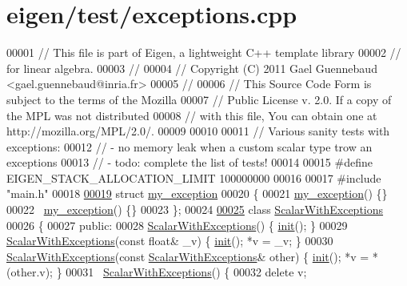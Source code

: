 \hypertarget{eigen_2test_2exceptions_8cpp_source}{}\section{eigen/test/exceptions.cpp}
\label{eigen_2test_2exceptions_8cpp_source}

\begin{DoxyCode}
00001 \textcolor{comment}{// This file is part of Eigen, a lightweight C++ template library}
00002 \textcolor{comment}{// for linear algebra.}
00003 \textcolor{comment}{//}
00004 \textcolor{comment}{// Copyright (C) 2011 Gael Guennebaud <gael.guennebaud@inria.fr>}
00005 \textcolor{comment}{//}
00006 \textcolor{comment}{// This Source Code Form is subject to the terms of the Mozilla}
00007 \textcolor{comment}{// Public License v. 2.0. If a copy of the MPL was not distributed}
00008 \textcolor{comment}{// with this file, You can obtain one at http://mozilla.org/MPL/2.0/.}
00009 
00010 
00011 \textcolor{comment}{// Various sanity tests with exceptions:}
00012 \textcolor{comment}{//  - no memory leak when a custom scalar type trow an exceptions}
00013 \textcolor{comment}{//  - todo: complete the list of tests!}
00014 
00015 \textcolor{preprocessor}{#define EIGEN\_STACK\_ALLOCATION\_LIMIT 100000000}
00016 
00017 \textcolor{preprocessor}{#include "main.h"}
00018 
\hyperlink{structmy__exception}{00019} \textcolor{keyword}{struct }\hyperlink{structmy__exception}{my\_exception}
00020 \{
00021   \hyperlink{structmy__exception}{my\_exception}() \{\}
00022   ~\hyperlink{structmy__exception}{my\_exception}() \{\}
00023 \};
00024     
\hyperlink{class_scalar_with_exceptions}{00025} \textcolor{keyword}{class }\hyperlink{class_scalar_with_exceptions}{ScalarWithExceptions}
00026 \{
00027   \textcolor{keyword}{public}:
00028     \hyperlink{class_scalar_with_exceptions}{ScalarWithExceptions}() \{ \hyperlink{structinit}{init}(); \}
00029     \hyperlink{class_scalar_with_exceptions}{ScalarWithExceptions}(\textcolor{keyword}{const} \textcolor{keywordtype}{float}& \_v) \{ \hyperlink{structinit}{init}(); *v = \_v; \}
00030     \hyperlink{class_scalar_with_exceptions}{ScalarWithExceptions}(\textcolor{keyword}{const} \hyperlink{class_scalar_with_exceptions}{ScalarWithExceptions}& other) \{ 
      \hyperlink{structinit}{init}(); *v = *(other.v); \}
00031     ~\hyperlink{class_scalar_with_exceptions}{ScalarWithExceptions}() \{
00032       \textcolor{keyword}{delete} v;

\end{DoxyCode}
